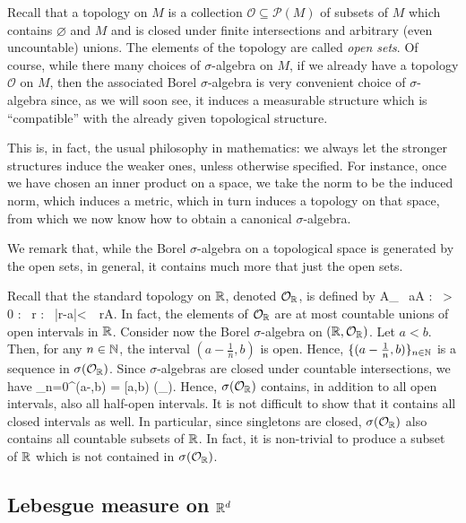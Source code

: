 Recall that a topology on $M$ is a collection $\mathcal{O}\subseteq\mathscr{P}(M)$ of subsets of $M$ which contains $\varnothing$ and $M$ and is closed under finite intersections and arbitrary (even uncountable) unions. The elements of the topology are called \emph{open sets}.
Of course, while there many choices of $\sigma$-algebra on $M$, if we already have a topology $\mathcal{O}$ on $M$, then the associated Borel $\sigma$-algebra is very convenient choice of $\sigma$-algebra since, as we will soon see, it induces a measurable structure which is ``compatible'' with the already given topological structure.

This is, in fact, the usual philosophy in mathematics: we always let the stronger structures induce the weaker ones, unless otherwise specified. For instance, once we have chosen an inner product on a space, we take the norm to be the induced norm, which induces a metric, which in turn induces a topology on that space, from which we now know how to obtain a canonical $\sigma$-algebra. 

We remark that, while the Borel $\sigma$-algebra on a topological space is generated by the open sets, in general, it contains much more that just the open sets.

\be
Recall that the standard topology on $\mathbb{R}$, denoted $\mathcal{O}_{\mathbb{R}}$, is defined by
\bse
A\in {}_{\R} \quad \Leftrightarrow \quad \forall \, a\in A : \exists \, \varepsilon > 0 : \forall \, r \in \R : \ |r-a|<\varepsilon \, \Rightarrow\,  r\in A.
\ese
In fact, the elements of $\mathcal{O}_{\mathbb{R}}$ are at most countable unions of open intervals in $\mathbb{R}$. Consider now the Borel $\sigma$-algebra on $(\mathbb{R},\mathcal{O}_{\mathbb{R}})$. Let $a<b$. Then, for any $n\in \mathbb{N}$, the interval $(a-\tfrac{1}{n},b)$ is open. Hence, $\{(a-\tfrac{1}{n},b)\}_{n\in \mathbb{N}}$ is a sequence in $\sigma(\mathcal{O}_{\mathbb{R}})$. Since $\sigma$-algebras are closed under countable intersections, we have
\bse
\bigcap_{n=0}^{\infty}(a-,b) = [a,b) \in \sigma(_{\R}).
\ese
Hence, $\sigma(\mathcal{O}_{\mathbb{R}})$ contains, in addition to all open intervals, also all half-open intervals. It is not difficult to show that it contains all closed intervals as well. In particular, since singletons are closed, $\sigma(\mathcal{O}_{\mathbb{R}})$ also contains all countable subsets of $\mathbb{R}$. In fact, it is non-trivial to produce a subset of $\mathbb{R}$ which is not contained in $\sigma(\mathcal{O}_{\mathbb{R}})$.
\ee

\subsection[\texorpdfstring{Lebesgue measure on $\R^d$}{Lebesgue measure on R\textasciicircum d}]{Lebesgue measure on $\R^d$}

